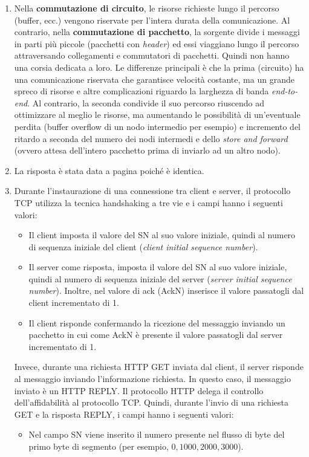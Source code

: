 \documentclass[a4paper]{article}
\begin{document}
	\begin{enumerate}
		\item Nella \textbf{commutazione di circuito}, le risorse richieste lungo il percorso (buffer, ecc.) vengono riservate per l'intera durata della comunicazione.\newline
		Al contrario, nella \textbf{commutazione di pacchetto}, la sorgente divide i messaggi in parti più piccole (pacchetti con \emph{header}) ed essi viaggiano lungo il percorso attraversando collegamenti e commutatori di pacchetti. Quindi non hanno una corsia dedicata a loro.\newline
		Le differenze principali è che la prima (circuito) ha una comunicazione riservata che garantisce velocità costante, ma un grande spreco di risorse e altre complicazioni riguardo la larghezza di banda \emph{end-to-end}. Al contrario, la seconda condivide il suo percorso riuscendo ad ottimizzare al meglio le risorse, ma aumentando le possibilità di un'eventuale perdita (buffer overflow di un nodo intermedio per esempio) e incremento del ritardo a seconda del numero dei nodi intermedi e dello \emph{store and forward} (ovvero attesa dell'intero pacchetto prima di inviarlo ad un altro nodo).
		
		\item La risposta è stata data a pagina \pageref{IPv6 extension header} poiché è identica.
		
		\item Durante l'instaurazione di una connessione tra client e server, il protocollo TCP utilizza la tecnica handshaking a tre vie e i campi hanno i seguenti valori:
		\begin{itemize}
			\item Il client imposta il valore del SN al suo valore iniziale, quindi al numero di sequenza iniziale del client (\emph{client initial sequence number}).
			
			\item Il server come risposta, imposta il valore del SN al suo valore iniziale, quindi al numero di sequenza iniziale del server (\emph{server initial sequence number}). Inoltre, nel valore di ack (AckN) inserisce il valore passatogli dal client incrementato di 1.
			
			\item Il client risponde confermando la ricezione del messaggio inviando un pacchetto in cui come AckN è presente il valore passatogli dal server incrementato di 1.
		\end{itemize}
		Invece, durante una richiesta HTTP GET inviata dal client, il server risponde al messaggio inviando l'informazione richiesta. In questo caso, il messaggio inviato è un HTTP REPLY. Il protocollo HTTP delega il controllo dell'affidabilità al protocollo TCP.\newline
		Quindi, durante l'invio di una richiesta GET e la risposta REPLY, i campi hanno i seguenti valori:
		\begin{itemize}
			\item Nel campo SN viene inserito il numero presente nel flusso di byte del primo byte di segmento (per esempio, $0, 1000, 2000, 3000$).
			

\end{itemize}
\end{enumerate}
\end{document}
